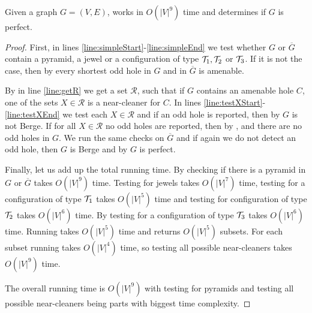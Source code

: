 \begin{theorem}
	Given a graph $G = (V, E)$,  works in $O(|V|^9)$ time and determines if $G$ is perfect.
\end{theorem}
\begin{proof}
	First, in lines \ref{line:simpleStart}-\ref{line:simpleEnd} we test whether $G$ or $\overline{G}$ contain a pyramid, a jewel or a configuration of type $\mathcal{T}_1, \mathcal{T}_2$ or $\mathcal{T}_3$. If it is not the case, then by  every shortest odd hole in $G$ and in $\overline{G}$ is amenable. 
	
	By  in line \ref{line:getR} we get a set $\mathcal{R}$, such that if $G$ contains an amenable hole $C$, one of the sets $X \in \mathcal{R}$ is a near-cleaner for $C$. In lines \ref{line:testXStart}-\ref{line:testXEnd} we test each $X \in \mathcal{R}$ and if an odd hole is reported, then by  $G$ is not Berge. If for all $X \in \mathcal{R}$ no odd holes are reported, then by ,  and  there are no odd holes in $G$. We run the same checks on $\overline{G}$ and if again we do not detect an odd hole, then $G$ is Berge and by  $G$ is perfect.

	Finally, let us add up the total running time. By  checking if there is a pyramid in $G$ or $\overline{G}$ takes $O(|V|^9)$ time. Testing for jewels takes $O(|V|^7)$ time, testing for a configuration of type $\mathcal{T}_1$ takes $O(|V|^5)$ time and testing for configuration of type $\mathcal{T}_2$ takes $O(|V|^6)$ time. By  testing for a configuration of type $\mathcal{T}_3$ takes $O(|V|^6)$ time. Running  takes $O(|V|^5)$ time and returns $O(|V|^5)$ subsets. For each subset running  takes $O(|V|^4)$ time, so testing all possible near-cleaners takes $O(|V|^9)$ time.

	The overall running time is $O(|V|^9)$ with testing for pyramids and testing all possible near-cleaners being parts with biggest time complexity.
\end{proof}